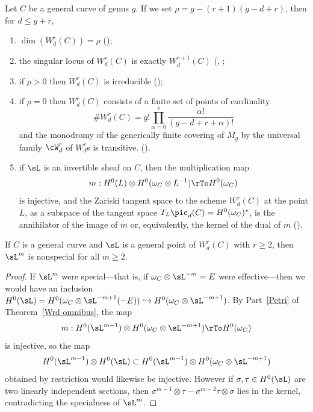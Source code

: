 \begin{theorem}\label{Wrd omnibus}
Let $C$ be a general curve of genus $g$. If we set $\rho = g - (r+1)(g-d+r)$, then for $d \leq g+r$,
\begin{enumerate}

\item $\dim(W^r_d(C)) = \rho$ (\cite{Griffiths-Harris-BN});\label{GH}

\item\label{sing wrd} the singular locus of $W^r_d(C)$ is exactly $W^{r+1}_d(C)$
(\cite{Gieseker-Petri}, \cite{Lazarsfeld-Petri};
\label{irr wrd} 

\item if $\rho > 0$ then $W^r_d(C)$ is irreducible (\cite{MR611386});

\item\label{rho=0} if $\rho = 0$ then $W^r_d(C)$ consists of a finite set of  points of cardinality
$$
\#W^r_d(C) = g! \prod_{\alpha=0}^r \frac{\alpha!}{(g-d+r+\alpha)!}
$$
and the monodromy of the generically finite covering of  $M_g$ by the universal family
$\cW^r_d$ of $W^r_d$s is transitive.
(\cite{zbMATH04014883}).

\item\label{Petri} if  $\sL$ is an invertible sheaf on $C$, then the multiplication map
$$
m : H^0(L) \otimes H^0(\omega_C\otimes L^{-1}) \rTo H^0(\omega_C)
$$
is injective, and the Zariski tangent space to the scheme $W^r_d(C)$ at the point $L$, as a subspace
of the tangent space $T_L\pic_d(C) = H^0(\omega_C)^*$, is the annihilator of the image of $m$
or, equivalently, the kernel of the dual of $m$ (\cite{Gieseker-Petri}).
\end{enumerate}
\end{theorem}

\begin{corollary}\label{2L nonspecial}
If $C$ is a general curve and $\sL$ is a general point of $W^r_d(C)$ with $r\geq 2$,
 then $\sL^m$ is nonspecial for all $m \geq 2$.
\end{corollary}

\begin{proof}
If $\sL^m$ were special---that is, if $\omega_C\otimes \sL^{-m} = E$ were effective---then we would have an inclusion $H^0(\sL) = H^0(\omega_C\otimes \sL^{-m+1}(-E)) \hookrightarrow H^0(\omega_C\otimes \sL^{-m+1})$. By Part~\ref{Petri} of Theorem~\ref{Wrd omnibus}, the map 
 $$
m : H^0(\sL^{m-1}) \otimes H^0(\omega_C\otimes \sL^{-m+1}) \rTo H^0(\omega_C)
$$
is injective, so the map
$$
H^0(\sL^{m-1}) \otimes H^0(\sL) \subset H^0(\sL^{m-1}) \otimes H^0(\omega_C\otimes \sL^{-m+1})
$$
obtained by restriction would likewise be injective.
However if $\sigma, \tau \in H^0(\sL)$ are two linearly independent sections, then $\sigma^{m-1} \otimes \tau - \sigma^{m-2}\tau \otimes \sigma$ lies in the kernel, contradicting the specialness of $\sL^m$.
\end{proof}

